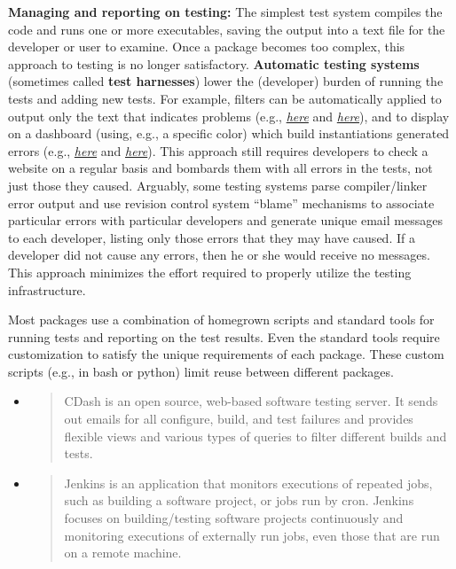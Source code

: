 \documentclass[]{article}
\begin{document}
\textbf{Managing and reporting on testing:} The simplest test system
compiles the code and runs one or more executables, saving the output
into a text file for the developer or user to examine. Once a package
becomes too complex, this approach to testing is no longer satisfactory.
\textbf{Automatic testing systems} (sometimes called \textbf{test
harnesses}) lower the (developer) burden of running the tests and adding
new tests. For example, filters can be automatically applied to output
only the text that indicates problems (e.g.,
\href{http://ftp.mcs.anl.gov/pub/petsc/nightlylogs/archive/2015/04/14/filtered-make_next_arch-linux-cxx-cmplx-pkgs-64idx_churn.log}{\emph{here}}
and
\href{http://testing.sandia.gov/cdash/viewBuildError.php?buildid=2021642}{\emph{here}}),
and to display on a dashboard (using, e.g., a specific color) which
build instantiations generated errors (e.g.,
\href{http://ftp.mcs.anl.gov/pub/petsc/nightlylogs/archive/2015/04/14/next.html}{\emph{here}}
and
\href{http://testing.sandia.gov/cdash/index.php?project=Trilinos\&date=2015-04-15\&display=project}{\emph{here}}).
This approach still requires developers to check a website on a regular
basis and bombards them with all errors in the tests, not just those
they caused. Arguably, some testing systems parse compiler/linker error
output and use revision control system ``blame'' mechanisms to associate
particular errors with particular developers and generate unique email
messages to each developer, listing only those errors that they may have
caused. If a developer did not cause any errors, then he or she would
receive no messages. This approach minimizes the effort required to
properly utilize the testing infrastructure.

Most packages use a combination of homegrown scripts and standard tools
for running tests and reporting on the test results. Even the standard
tools require customization to satisfy the unique requirements of each
package. These custom scripts (e.g., in bash or python) limit reuse
between different packages.

\begin{itemize}
\item
  \begin{quote}
  CDash is an open source, web-based software testing server. It sends
  out emails for all configure, build, and test failures and provides
  flexible views and various types of queries to filter different builds
  and tests.
  \end{quote}
\item
  \begin{quote}
  Jenkins is an application that monitors executions of repeated jobs,
  such as building a software project, or jobs run by cron. Jenkins
  focuses on building/testing software projects continuously and
  monitoring executions of externally run jobs, even those that are run
  on a remote machine.
  \end{quote}
\end{itemize}
\end{document}
